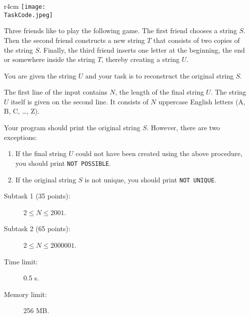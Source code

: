 \documentclass{boi2014}
\renewcommand{\TaskCode}{friends}
\begin{document}
    \begin{wrapfigure}{r}{4cm}
        \vspace{-24pt}
		\texttt{[image: \\TaskCode.jpeg]}
	\end{wrapfigure}
    Three friends like to play the following game.
    The first friend chooses a string $S$.
    Then the second friend constructs a new string $T$ that consists of
    two copies of the string $S$. 
    Finally, the third friend inserts one letter at the beginning, the end or somewhere
    inside the string $T$, thereby creating a string $U$.

    \Task
    You are given the string $U$ and your task is to reconstruct the original string $S$.

    \Input
    The first line of the input contains $N$, the length of the final string $U$.
    The string $U$ itself is given on the second line. It consists of $N$
    uppercase English letters (A, B, C, \ldots{}, Z).

    \Output
    Your program should print the original string $S$.
    However, there are two exceptions:
    \begin{enumerate}
        \item If the final string $U$ could not have been created using the above
        procedure, you should print {\tt NOT POSSIBLE}.
        \item If the original string $S$ is not unique, you should print {\tt NOT
        UNIQUE}.
    \end{enumerate}

    \Examples


    \Scoring

    \begin{description}
        \item[Subtask 1 (35 points):] $2 \le N \le 2001$.
        \item[Subtask 2 (65 points):] $2 \le N \le 2000001$.
    \end{description}

    \Constraints

    \begin{description}
        \item[Time limit:] 0.5 s.
        \item[Memory limit:] 256 MB.
    \end{description}
\end{document}
